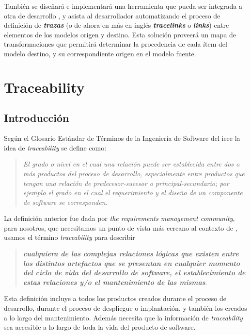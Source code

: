 \documentclass[a4paper,12pt,oneside,spanish]{book}
\begin{document}
También se diseñará e implementará una herramienta que pueda ser integrada a otra de desarrollo , y asista al desarrollador automatizando el proceso de definición de \textit{\textbf{trazas}} (o de ahora en más en inglés \textit{\textbf{tracelinks}} o \textit{\textbf{links}}) entre elementos de los modelos origen y destino. Esta solución proveerá un mapa de transformaciones que permitirá determinar la procedencia de cada ítem del modelo destino, y su correspondiente origen en el modelo fuente.


\mainmatter

\chapter{Traceability}

\section{Introducción}

Según el Glosario Estándar de Términos de la Ingeniería de Software del \gls{ieee} \cite{IEEE} la idea de \textit{traceability} se define como: 
\begin{quote}
\small \textit{El grado o nivel en el cual una relación puede ser establecida entre dos o más productos del proceso de desarrollo, especialmente entre productos que tengan una relación de predecesor-sucesor o principal-secundario; por ejemplo el grado en el cual el requerimiento y el diseño de un componente de software se corresponden}.
\end{quote}

La definición anterior fue dada por \textit{the requirements management community}, para nosotros, que necesitamos un punto de vista más cercano al contexto de , usamos el término \textit{traceability} para describir 
\begin{quote}
\small \textit{\textbf{cualquiera de las complejas relaciones lógicas que existen entre los distintos artefactos que se presentan en cualquier momento del ciclo de vida del desarrollo de software, el establecimiento de estas relaciones y/o el mantenimiento de las mismas}}.
\end{quote}

Esta definición incluye a todos los productos creados durante el proceso de desarrollo, durante el proceso de despliegue o implantación, y también los creados a lo largo del mantenimiento. Además necesita que la información de \textit{traceability} sea accesible a lo largo de toda la vida del producto de software.
\end{document}
